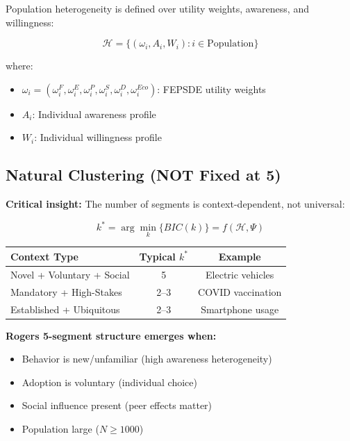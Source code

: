 Population heterogeneity is defined over utility weights, awareness, and willingness:

\begin{equation}
\boxed{
\mathcal{H} = \{(\omega_i, A_i, W_i) : i \in \text{Population}\}
}
\label{eq:mp-heterogeneity-space}
\end{equation}

where:
\begin{itemize}[nosep]
\item $\omega_i = (\omega^F_i, \omega^E_i, \omega^P_i, \omega^S_i, \omega^D_i, \omega^{Eco}_i)$: FEPSDE utility weights
\item $A_i$: Individual awareness profile
\item $W_i$: Individual willingness profile
\end{itemize}

\subsection{Natural Clustering (NOT Fixed at 5)}

\textbf{Critical insight:} The number of segments is context-dependent, not universal:

\begin{equation}
\boxed{
k^* = \arg\min_k \{ BIC(k) \} = f(\mathcal{H}, \Psi)
}
\label{eq:mp-optimal-k}
\end{equation}

\begin{center}
\renewcommand{\arraystretch}{1.2}
\begin{tabular}{@{}lcc@{}}
\toprule
\textbf{Context Type} & \textbf{Typical $k^*$} & \textbf{Example} \\
\midrule
Novel + Voluntary + Social & 5 & Electric vehicles \\
Mandatory + High-Stakes & 2--3 & COVID vaccination \\
Established + Ubiquitous & 2--3 & Smartphone usage \\
\bottomrule
\end{tabular}
\end{center}

\textbf{Rogers 5-segment structure emerges when:}
\begin{itemize}[nosep]
\item Behavior is new/unfamiliar (high awareness heterogeneity)
\item Adoption is voluntary (individual choice)
\item Social influence present (peer effects matter)
\item Population large ($N \geq 1000$)
\end{itemize}

